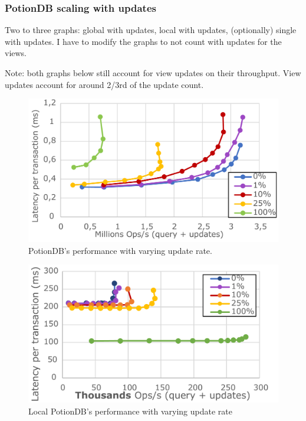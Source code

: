 \documentclass[sigplan,10pt]{acmart}
\begin{document}
\subsubsection{PotionDB scaling with updates}

Two to three graphs: global with updates, local with updates, (optionally) single with updates. I have to modify the graphs to not count with updates for the views.

Note: both graphs below still account for view updates on their throughput. 
View updates account for around 2/3rd of the update count.


\begin{figure}[h]
	\centering
	\includegraphics[width=.75\linewidth]{updRate_global_cut}
	\caption{PotionDB's performance with varying update rate.}
	\label{fig:(new)update_rates}
\end{figure}

\begin{figure}[h]
	\centering
	\includegraphics[width=.7\linewidth]{updRate_tc_cut}
	\caption{Local PotionDB's performance with varying update rate}
	\label{fig:(new)update_rates_tc}
\end{figure}
\end{document}
